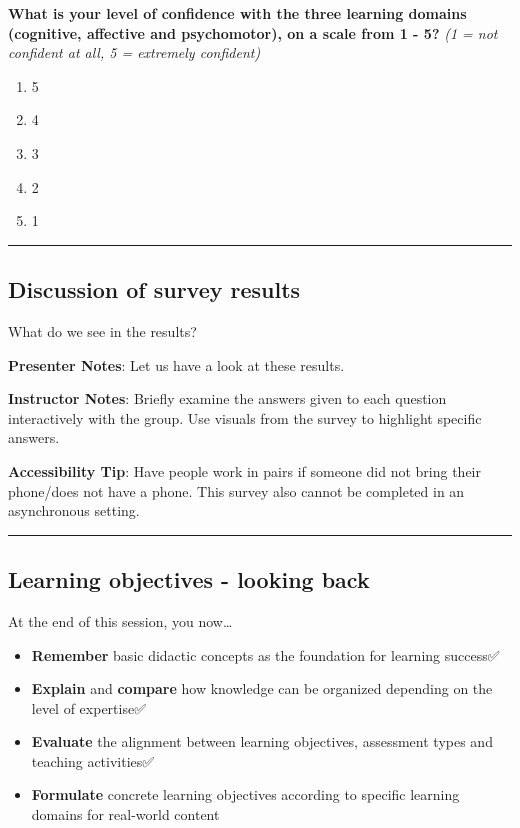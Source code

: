 \documentclass[
  letterpaper,
  DIV=11,
  numbers=noendperiod]{scrartcl}
\providecommand{\tightlist}{%
  \setlength{\itemsep}{0pt}\setlength{\parskip}{0pt}}
\begin{document}
\textbf{What is your level of confidence with the three learning domains
(cognitive, affective and psychomotor), on a scale from 1 - 5?} \emph{(1
= not confident at all, 5 = extremely confident)}

\begin{enumerate}
\def\labelenumi{\alph{enumi}.}
\item
  5
\item
  4
\item
  3
\item
  2
\item
  1
\end{enumerate}

\begin{center}\rule{0.5\linewidth}{0.5pt}\end{center}

\subsection{Discussion of survey
results}\label{discussion-of-survey-results-1}

What do we see in the results?

\textbf{Presenter Notes}: Let us have a look at these results.

\textbf{Instructor Notes}: Briefly examine the answers given to each
question interactively with the group. Use visuals from the survey to
highlight specific answers.

\textbf{Accessibility Tip}: Have people work in pairs if someone did not
bring their phone/does not have a phone. This survey also cannot be
completed in an asynchronous setting.

\begin{center}\rule{0.5\linewidth}{0.5pt}\end{center}

\subsection{Learning objectives - looking
back}\label{learning-objectives---looking-back}

At the end of this session, you now\ldots{}

\begin{itemize}
\tightlist
\item
  \textbf{Remember} basic didactic concepts as the foundation for
  learning success✅
\item
  \textbf{Explain} and \textbf{compare} how knowledge can be organized
  depending on the level of expertise✅
\item
  \textbf{Evaluate} the alignment between learning objectives,
  assessment types and teaching activities✅
\item
  \textbf{Formulate} concrete learning objectives according to specific
  learning domains for real-world content
\end{itemize}
\end{document}
